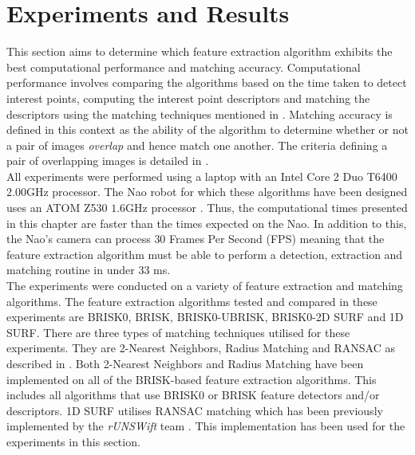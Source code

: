 \documentclass[11pt]{report}
\begin{document}



\chapter{Experiments and Results}
\label{sec:experimentsResults}
This section aims to determine which feature extraction algorithm exhibits the best  computational performance and matching accuracy. Computational performance involves comparing the algorithms based on the time taken to detect interest points, computing the interest point descriptors and matching the descriptors using the matching techniques mentioned in . Matching accuracy is defined in this context as the ability of the algorithm to determine whether or not a pair of images \textit{overlap} and hence match one another. The criteria defining a pair of overlapping images is detailed in .\\

All experiments were performed using a laptop with an Intel Core 2 Duo T6400 $2.00$GHz processor. The Nao robot for which these algorithms have been designed uses an ATOM Z530 $1.6$GHz processor \citep{NaoHead}. Thus, the computational times presented in this chapter are faster than the times expected on the Nao. In addition to this, the Nao's camera can process $30$ Frames Per Second (FPS) meaning that the feature extraction algorithm must be able to perform a detection, extraction and matching routine in under $33$ ms.\\

The experiments were conducted on a variety of feature extraction and matching algorithms. The feature extraction algorithms tested and compared in these experiments are BRISK0, BRISK, BRISK0-UBRISK, BRISK0-2D SURF and 1D SURF. There are three types of matching techniques utilised for these experiments. They are 2-Nearest Neighbors, Radius Matching and RANSAC as described in . Both 2-Nearest Neighbors and Radius Matching have been implemented on all of the BRISK-based feature extraction algorithms. This includes all algorithms that use BRISK0 or BRISK feature detectors and/or descriptors. 1D SURF utilises RANSAC matching which has been previously implemented by the \textit{rUNSWift} team \citep{Anderson}. This implementation has been used for the experiments in this section.\\ 
\end{document}
